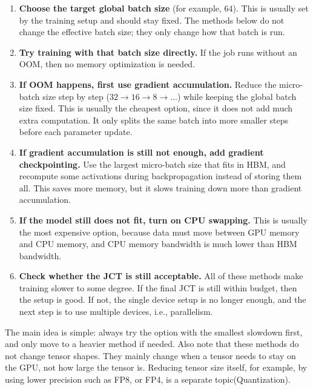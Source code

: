 \begin{enumerate}
    \item \textbf{Choose the target global batch size} (for example, $64$). This is usually set by the training setup and should stay fixed. The methods below do not change the effective batch size; they only change how that batch is run.

    \item \textbf{Try training with that batch size directly.} If the job runs without an OOM, then no memory optimization is needed.

    \item \textbf{If OOM happens, first use gradient accumulation.} Reduce the micro-batch size step by step ($32 \to 16 \to 8 \to \ldots$) while keeping the global batch size fixed. This is usually the cheapest option, since it does not add much extra computation. It only splits the same batch into more smaller steps before each parameter update.

    \item \textbf{If gradient accumulation is still not enough, add gradient checkpointing.} Use the largest micro-batch size that fits in HBM, and recompute some activations during backpropagation instead of storing them all. This saves more memory, but it slows training down more than gradient accumulation.

    \item \textbf{If the model still does not fit, turn on CPU swapping.} This is usually the most expensive option, because data must move between GPU memory and CPU memory, and CPU memory bandwidth is much lower than HBM bandwidth.

    \item \textbf{Check whether the JCT is still acceptable.} All of these methods make training slower to some degree. If the final JCT is still within budget, then the setup is good. If not, the single device setup is no longer enough, and the next step is to use multiple devices, i.e., parallelism.
\end{enumerate}

The main idea is simple: always try the option with the smallest slowdown first, and only move to a heavier method if needed. Also note that these methods do not change tensor shapes. They mainly change when a tensor needs to stay on the GPU, not how large the tensor is. Reducing tensor size itself, for example, by using lower precision such as FP8, or FP4, is a separate topic(Quantization).
